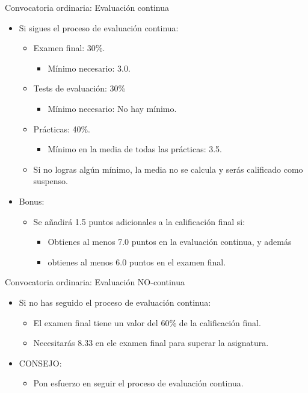 \begin{frame}[t]{Convocatoria ordinaria: Evaluación continua}
\begin{itemize}
  \item Si sigues el proceso de evaluación continua:
    \begin{itemize}
    \item Examen final: 30\%.
      \begin{itemize}
        \item Mínimo necesario: 3.0.
      \end{itemize}
    \item Tests de evaluación: 30\%
      \begin{itemize}
        \item Mínimo necesario: \alert{No hay mínimo}.
      \end{itemize}
    \item Prácticas: 40\%.
      \begin{itemize}
        \item Mínimo en la media de todas las prácticas: 3.5.
      \end{itemize}
    \item Si no logras algún mínimo, la media no se calcula y serás calificado como suspenso.
  \end{itemize}
  \item \alert{Bonus}:
    \begin{itemize}
      \item Se añadirá 1.5 puntos adicionales a la calificación final si:
        \begin{itemize}
          \item Obtienes al menos 7.0 puntos en la evaluación continua, y además
          \item obtienes al menos 6.0 puntos en el examen final.
        \end{itemize}
    \end{itemize}
\end{itemize}
\end{frame}

\begin{frame}[t]{Convocatoria ordinaria: Evaluación NO-continua}
\begin{itemize}
  \item Si no has seguido el proceso de evaluación continua:
    \begin{itemize}
      \item El examen final tiene un valor del 60\% de la calificación final.
      \item Necesitarás 8.33 en ele examen final para superar la asignatura.
    \end{itemize}
  \item \alert{CONSEJO}:
    \begin{itemize}
      \item Pon esfuerzo en seguir el proceso de evaluación continua.
    \end{itemize}
\end{itemize}
\end{frame}


